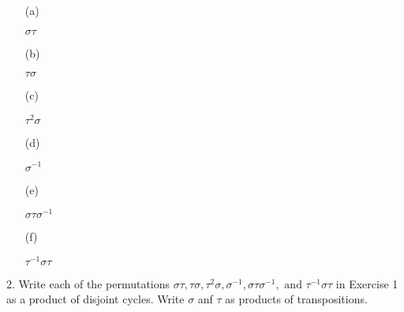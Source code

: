 \begin{mdframed}[style=darkAnswer,frametitle={Joe Starr}]
  \begin{itemize}
    \item [(a)]{$\sigma\tau$

          }
    \item [(b)]{$\tau\sigma$

          }
    \item [(c)]{$\tau^2\sigma$

          }
    \item [(d)]{$\sigma^{-1}$

          }
    \item [(e)]{$\sigma\tau\sigma^{-1}$

          }
    \item [(f)]{$\tau^{-1}\sigma\tau$

          }
  \end{itemize}
\end{mdframed}
\newpage
\begin{mdframed}[style=darkQuesion]
  2. Write each of the permutations $\sigma\tau, \tau\sigma, \tau^2\sigma,
    \sigma^{-1}, \sigma\tau\sigma^{-1}, \text{ and } \tau^{-1}\sigma\tau$ in
  Exercise 1 as a product of disjoint cycles. Write $\sigma$ anf $\tau$ as
  products of transpositions.
\end{mdframed}

